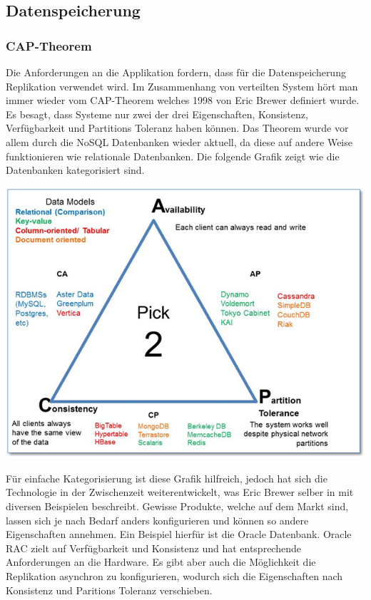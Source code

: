 \subsection{Datenspeicherung}

\subsubsection{CAP-Theorem}
Die Anforderungen an die Applikation fordern, dass für die Datenspeicherung Replikation verwendet wird. Im Zusammenhang von verteilten System hört man immer wieder vom CAP-Theorem welches 1998 von Eric Brewer definiert wurde. Es besagt, dass Systeme nur zwei der drei Eigenschaften, Konsistenz, Verfügbarkeit und Partitions Toleranz haben können. Das Theorem wurde vor allem durch die NoSQL Datenbanken wieder aktuell, da diese auf andere Weise funktionieren wie relationale Datenbanken. Die folgende Grafik zeigt wie die Datenbanken kategorisiert sind.
\begin{center}
	\includegraphics[scale=0.60]{cap.png}\newline
	\cite{cap}
\end{center}
Für einfache Kategorisierung ist diese Grafik hilfreich, jedoch hat sich die Technologie in der Zwischenzeit weiterentwickelt, was Eric Brewer selber in \cite{capnew} mit diversen Beispielen beschreibt. Gewisse Produkte, welche auf dem Markt sind, lassen sich je nach Bedarf anders konfigurieren und können so andere Eigenschaften annehmen. Ein Beispiel hierfür ist die Oracle Datenbank. Oracle RAC zielt auf Verfügbarkeit und Konsistenz und hat entsprechende Anforderungen an die Hardware. Es gibt aber auch die Möglichkeit die Replikation asynchron zu konfigurieren, wodurch sich die Eigenschaften nach Konsistenz und Paritions Toleranz verschieben. 

